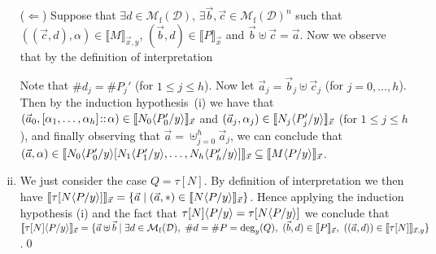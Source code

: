 \documentclass{LMCS}
\newcommand{\st}{ \mid }
\newcommand{\card}[1]{\# #1}
\newcommand{\Set}[1]{\Lambda^{#1}}
\newcommand{\Int}[1]{\llbracket #1\rrbracket} \newcommand{\trm}[1]{#1^{\textrm{--}}}
\newcommand{\Mfin}[1]{\mathcal{M}_{\mathrm{f}}(#1)}
\newcommand{\mcup}{\uplus}
\newcommand{\seq}[1]{\vec{#1}}
\newcommand{\gt}{\ensuremath{\tau}}
\newcommand{\cD}{\mathcal{D}}
\begin{document}
\begin{enumerate}[(i)]
($\Leftarrow$) Suppose that $\exists d \in \Mfin{\cD}$, $\exists \seq b,\seq c \in \Mfin{\cD}^n$ such that $((\seq c,d),\alpha) \in \Int{M}_{\seq x,y}$, $(\seq b,d) \in \Int{P}_{\seq x}$ and $\seq b \mcup \seq c = \seq a$. Now we observe that by the definition of interpretation
Note that $\card{d_j} =\card{P_j'}$ (for $1\leq j\leq h$). Now let $\seq a_j = \seq b_j\mcup\seq c_j$ (for $j=0,\ldots,h$). Then by the induction hypo\-thesis~(i) we have that $(\seq a_0,[\alpha_1,\ldots,\alpha_h] \at \alpha)\in \Int{N_0\lsubst{y}{P_0'}}_{\seq x}$ and $(\seq a_j,\alpha_j) \in \Int{N_j\lsubst{y}{P_j'}}_{\seq x}$ (for $1\le j\le h$), and finally observing that $\seq a = \mcup_{j=0}^{h} \seq a_j$, we can conclude that $(\seq a,\alpha)\in \Int{N_0\lsubst{y}{P_0'}[N_1\lsubst{y}{P_1'},\ldots,N_h\lsubst{y}{P_h'}]}_{\seq x} \subseteq \Int{M\lsubst{y}{P}}_{\seq x}$.

\item We just consider the case $Q = \gt[N]$. By definition of
  interpretation we then have $\Int{\gt[N\lsubst{y}{P}]}_{\seq x} = \{\seq a \st (\seq a,*) \in \Int{N\lsubst{y}{P}}_{\seq x} \}$. Hence applying the induction hypothesis (i) and the fact that $\gt[N]\lsubst{y}{P} = \gt[N\lsubst{y}{P}]$ we conclude that $\Int{\gt[N]\lsubst{y}{P}}_{\seq x} = \{\seq a \mcup \seq b \st \exists d \in \Mfin{\cD},\ \card{d} = \card{P}=\dg{y}{Q},\ (\seq b,d)\in\Int{P}_{\seq x},\ ((\seq a,d)) \in \Int{\gt[N]}_{\seq x,y} \}$.\qed
\end{enumerate}
\end{document}
